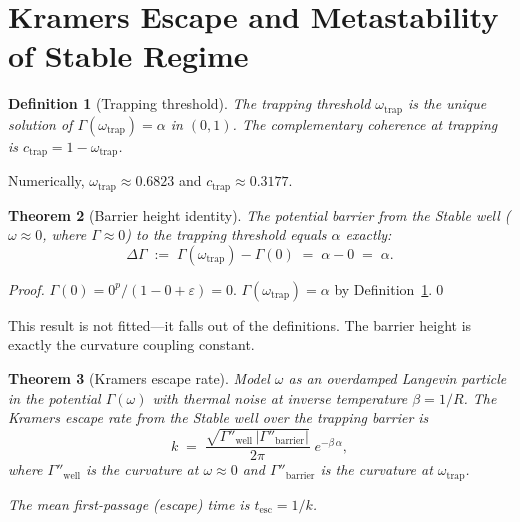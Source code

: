 \documentclass[
  aps,
  prd,
  twocolumn,
  showpacs,
  superscriptaddress,
  nofootinbib,
  floatfix
]{revtex4-2}
\newtheorem{theorem}{Theorem}
\newtheorem{definition}[theorem]{Definition}
\newcommand{\Gam}{\Gamma}
\newcommand{\eps}{\varepsilon}
\newcommand{\beq}{\begin{equation}}
\newcommand{\eeq}{\end{equation}}
\begin{document}
\section{Kramers Escape and Metastability of Stable
  Regime}\label{sec:kramers}

\begin{definition}[Trapping threshold]\label{def:trap}
The trapping threshold $\omega_{\mathrm{trap}}$ is the unique
solution of $\Gam(\omega_{\mathrm{trap}})=\alpha$ in $(0,1)$.
The complementary coherence at trapping is
$c_{\mathrm{trap}}=1-\omega_{\mathrm{trap}}$.
\end{definition}

Numerically, $\omega_{\mathrm{trap}}\approx 0.6823$ and
$c_{\mathrm{trap}}\approx 0.3177$.

\begin{theorem}[Barrier height identity]\label{thm:barrier}
The potential barrier from the Stable well
($\omega\approx 0$, where\/ $\Gam\approx 0$) to the trapping
threshold equals $\alpha$ exactly:
\beq\label{eq:barrier}
  \Delta\Gam
  \;:=\; \Gam(\omega_{\mathrm{trap}}) - \Gam(0)
  \;=\; \alpha - 0
  \;=\; \alpha.
\eeq
\end{theorem}

\begin{proof}
$\Gam(0) = 0^{p}/(1-0+\eps) = 0$.
$\Gam(\omega_{\mathrm{trap}}) = \alpha$ by
Definition~\ref{def:trap}.\qed
\end{proof}

This result is not fitted---it falls out of the definitions.
The barrier height is exactly the curvature coupling constant.

\begin{theorem}[Kramers escape rate]\label{thm:kramers}
Model $\omega$ as an overdamped Langevin particle in the potential
$\Gam(\omega)$ with thermal noise at inverse temperature
$\beta=1/R$.  The Kramers escape rate from the Stable well over
the trapping barrier is
\beq\label{eq:kramers}
  k \;=\;
  \frac{\sqrt{\Gam''_{\mathrm{well}}\,
        |\Gam''_{\mathrm{barrier}}|}}{2\pi}\;
  e^{-\beta\,\alpha},
\eeq
where $\Gam''_{\mathrm{well}}$ is the curvature at $\omega\approx 0$
and\/ $\Gam''_{\mathrm{barrier}}$ is the curvature at\/
$\omega_{\mathrm{trap}}$.

The mean first-passage (escape) time is $t_{\!\mathrm{esc}}=1/k$.
\end{theorem}
\end{document}
